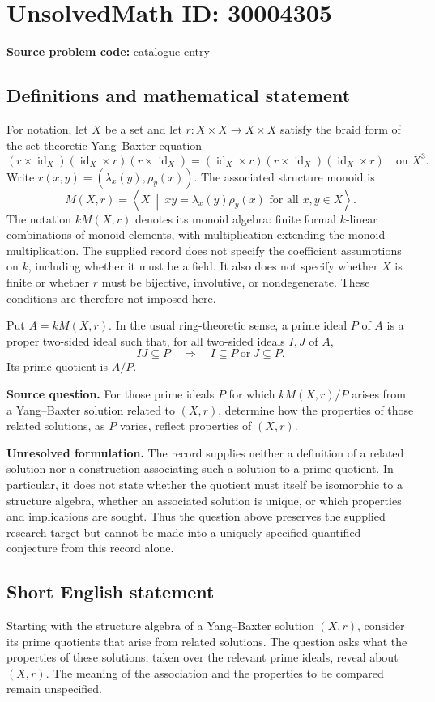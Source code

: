 \documentclass[11pt]{article}
\begin{document}
\section*{UnsolvedMath ID: 30004305}
\textbf{Source problem code:} catalogue entry
\subsection{Definitions and mathematical statement}
For notation, let \(X\) be a set and let \(r\colon X\times X\to X\times X\) satisfy the braid form of the set-theoretic Yang--Baxter equation
\[
(r\times\operatorname{id}_X)(\operatorname{id}_X\times r)(r\times\operatorname{id}_X)
=
(\operatorname{id}_X\times r)(r\times\operatorname{id}_X)(\operatorname{id}_X\times r)
\quad\text{on }X^3.
\]
Write \(r(x,y)=(\lambda_x(y),\rho_y(x))\). The associated structure monoid is
\[
M(X,r)=\left\langle X\ \middle|\ xy=\lambda_x(y)\rho_y(x)\text{ for all }x,y\in X\right\rangle.
\]
The notation \(kM(X,r)\) denotes its monoid algebra: finite formal \(k\)-linear combinations of monoid elements, with multiplication extending the monoid multiplication. The supplied record does not specify the coefficient assumptions on \(k\), including whether it must be a field. It also does not specify whether \(X\) is finite or whether \(r\) must be bijective, involutive, or nondegenerate. These conditions are therefore not imposed here.

Put \(A=kM(X,r)\). In the usual ring-theoretic sense, a prime ideal \(P\) of \(A\) is a proper two-sided ideal such that, for all two-sided ideals \(I,J\) of \(A\),
\[
IJ\subseteq P\quad\Longrightarrow\quad I\subseteq P\ \text{or}\ J\subseteq P.
\]
Its prime quotient is \(A/P\).

\textbf{Source question.} For those prime ideals \(P\) for which \(kM(X,r)/P\) arises from a Yang--Baxter solution related to \((X,r)\), determine how the properties of those related solutions, as \(P\) varies, reflect properties of \((X,r)\).

\textbf{Unresolved formulation.} The record supplies neither a definition of a related solution nor a construction associating such a solution to a prime quotient. In particular, it does not state whether the quotient must itself be isomorphic to a structure algebra, whether an associated solution is unique, or which properties and implications are sought. Thus the question above preserves the supplied research target but cannot be made into a uniquely specified quantified conjecture from this record alone.
\subsection{Short English statement}
Starting with the structure algebra of a Yang--Baxter solution \((X,r)\), consider its prime quotients that arise from related solutions. The question asks what the properties of these solutions, taken over the relevant prime ideals, reveal about \((X,r)\). The meaning of the association and the properties to be compared remain unspecified.
\end{document}
